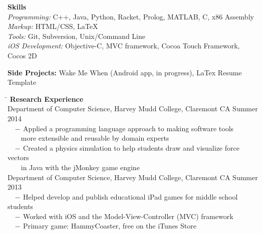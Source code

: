 \documentclass[12pt]{article}
\newcommand{\sectionNL}{\\[2pt]}
\newcommand{\customtab}{$\hspace{10pt} - \hspace{2pt}$}
\newcommand{\customtabinline}{$\hspace{23pt}$}
\begin{document}
\begin{flushleft}
{\textbf{Skills}} \sectionNL
\textit{Programming:} C++, Java, Python, Racket, Prolog, MATLAB, C, x86 Assembly\\
\textit{Markup:} HTML/CSS, LaTeX \\
\textit{Tools:} Git, Subversion, Unix/Command Line \\
\textit{iOS Development:} Objective-C, MVC framework, Cocoa Touch Framework, Cocos 2D %
\end{flushleft}

\begin{flushleft}
\textbf{Side Projects:} Wake Me When (Android app, in progress), LaTex Resume Template 
\end{flushleft}


\begin{tabbing} 
\hspace*{6.5in}\= \kill
{\textbf{Research Experience} } \> \sectionNL
Department of Computer Science, Harvey Mudd College, Claremont CA \>Summer 2014 \\
\customtab Applied a programming language approach to making software tools \\
\customtabinline more extensible and reusable by domain experts \\
\customtab Created a physics simulation to help students draw and visualize force vectors \\
 \customtabinline in Java with the jMonkey game engine  \\

Department of Computer Science, Harvey Mudd College, Claremont CA \>Summer 2013 \\
\customtab Helped develop and publish educational iPad games for middle school students \\
\customtab Worked with iOS and the Model-View-Controller (MVC) framework \\
\customtab Primary game: HammyCoaster, free on the iTunes Store
\end{tabbing}
\end{document}
